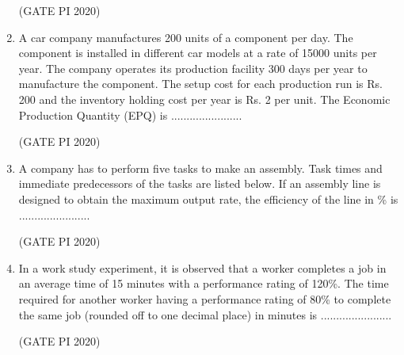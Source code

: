 \documentclass[journal,12pt,onecolumn]{IEEEtran}
\theoremstyle{remark}
\begin{document}
\begin{enumerate}
\hfill (GATE PI 2020)

\item A car company manufactures 200 units of a component per day. The component is installed in different car models at a rate of 15000 units per year. The company operates its production facility 300 days per year to manufacture the component. The setup cost for each production run is Rs. 200 and the inventory holding cost per year is Rs. 2 per unit. The Economic Production Quantity (EPQ) is .......................

\hfill (GATE PI 2020)

\item A company has to perform five tasks  to make an assembly. Task times and immediate predecessors of the tasks are listed below. If an assembly line is designed to obtain the maximum output rate, the efficiency of the line in \% is .......................



\hfill (GATE PI 2020)

\item In a work study experiment, it is observed that a worker completes a job in an average time of 15 minutes with a performance rating of 120\%. The time required for another worker having a performance rating of 80\% to complete the same job (rounded off to one decimal place) in minutes is .......................

\hfill (GATE PI 2020)

\end{enumerate}


\end{document}
